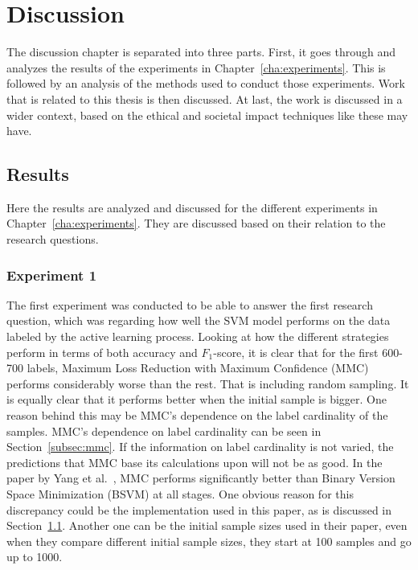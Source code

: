\chapter{Discussion}
\label{cha:discussion}

The discussion chapter is separated into three parts.
First, it goes through and analyzes the results of the experiments in Chapter~\ref{cha:experiments}.
This is followed by an analysis of the methods used to conduct those experiments.
Work that is related to this thesis is then discussed.
At last, the work is discussed in a wider context, based on the ethical and societal impact techniques like these may have.

\section{Results}
\label{sec:discussion-results}

Here the results are analyzed and discussed for the different experiments in Chapter~\ref{cha:experiments}.
They are discussed based on their relation to the research questions.

\subsection{Experiment 1}

The first experiment was conducted to be able to answer the first research question, which was regarding how well the SVM model performs on the data labeled by the active learning process.
Looking at how the different strategies perform in terms of both accuracy and $F_1$-score, it is clear that for the first 600-700 labels, Maximum Loss Reduction with Maximum Confidence (MMC) performs considerably worse than the rest.
That is including random sampling.
It is equally clear that it performs better when the initial sample is bigger.
One reason behind this may be MMC's dependence on the label cardinality of the samples.
MMC's dependence on label cardinality can be seen in Section~\ref{subsec:mmc}.
If the information on label cardinality is not varied, the predictions that MMC base its calculations upon will not be as good.
In the paper by Yang et al\@.~\cite{yang2009effective}, MMC performs significantly better than Binary Version Space Minimization (BSVM) at all stages.
One obvious reason for this discrepancy could be the implementation used in this paper, as is discussed in Section~\ref{sec:discussion-results}.
Another one can be the initial sample sizes used in their paper, even when they compare different initial sample sizes, they start at 100 samples and go up to 1000.

